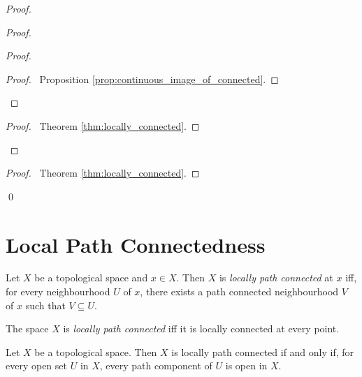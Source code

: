 \begin{proof}
\pf
{}
\begin{proof}
	\begin{proof}
		\begin{proof}
			\pf\ Proposition \ref{prop:continuous_image_of_connected}.
		\end{proof}
	\end{proof}
	\begin{proof}
		\pf\ Theorem \ref{thm:locally_connected}.
	\end{proof}
\end{proof}
\begin{proof}
	\pf\ Theorem \ref{thm:locally_connected}.
\end{proof}
\qed
\end{proof}

\section{Local Path Connectedness}

\begin{df}
Let $X$ be a topological space and $x \in X$. Then $X$ is \emph{locally path connected} at $x$ iff, for every neighbourhood $U$ of $x$, there exists a path connected neighbourhood $V$ of $x$ such that $V \subseteq U$.

The space $X$ is \emph{locally path connected} iff it is locally connected at every point.
\end{df}

\begin{thm}
\label{thm:locally_path_connected_path_components_open}
Let $X$ be a topological space. Then $X$ is locally path connected if and only if, for every open set $U$ in $X$, every path component of $U$ is open in $X$.
\end{thm}

